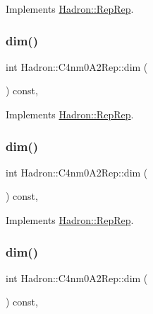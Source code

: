 Implements \mbox{\hyperlink{structHadron_1_1RepRep_a92c8802e5ed7afd7da43ccfd5b7cd92b}{Hadron\+::\+Rep\+Rep}}.

\mbox{\label{structHadron_1_1C4nm0A2Rep_ad3e51768eee5d4652aa8ceae670d6fb9}} 
\subsubsection{\texorpdfstring{dim()}{dim()}\hspace{0.1cm}{\footnotesize\ttfamily [3/5]}}
{\footnotesize\ttfamily int Hadron\+::\+C4nm0\+A2\+Rep\+::dim (\begin{DoxyParamCaption}{ }\end{DoxyParamCaption}) const\hspace{0.3cm}{\ttfamily [inline]}, {\ttfamily [virtual]}}



Implements \mbox{\hyperlink{structHadron_1_1RepRep_a92c8802e5ed7afd7da43ccfd5b7cd92b}{Hadron\+::\+Rep\+Rep}}.

\mbox{\label{structHadron_1_1C4nm0A2Rep_ad3e51768eee5d4652aa8ceae670d6fb9}} 
\subsubsection{\texorpdfstring{dim()}{dim()}\hspace{0.1cm}{\footnotesize\ttfamily [4/5]}}
{\footnotesize\ttfamily int Hadron\+::\+C4nm0\+A2\+Rep\+::dim (\begin{DoxyParamCaption}{ }\end{DoxyParamCaption}) const\hspace{0.3cm}{\ttfamily [inline]}, {\ttfamily [virtual]}}



Implements \mbox{\hyperlink{structHadron_1_1RepRep_a92c8802e5ed7afd7da43ccfd5b7cd92b}{Hadron\+::\+Rep\+Rep}}.

\mbox{\label{structHadron_1_1C4nm0A2Rep_ad3e51768eee5d4652aa8ceae670d6fb9}} 
\subsubsection{\texorpdfstring{dim()}{dim()}\hspace{0.1cm}{\footnotesize\ttfamily [5/5]}}
{\footnotesize\ttfamily int Hadron\+::\+C4nm0\+A2\+Rep\+::dim (\begin{DoxyParamCaption}{ }\end{DoxyParamCaption}) const\hspace{0.3cm}{\ttfamily [inline]}, {\ttfamily [virtual]}}




